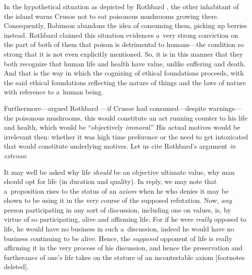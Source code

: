 In the hypothetical situation as depicted by Rothbard 
\parencite*[][p.32]{}, %
 the other inhabitant of the island warns Crusoe not to eat poisonous mushrooms growing there. Consequently, Robinson abandons the idea of consuming them, picking up berries instead. Rothbard claimed this situation evidences a~very strong conviction on the part of both of them that poison is detrimental to humans---the condition so strong that it is not even explicitly mentioned. So, it is in this manner that they both recognize that human life and health have value, unlike suffering and death. And that is the way in which the cognizing of ethical foundations proceeds, with the said ethical foundations reflecting the nature of things and the laws of nature with reference to a~human being.



Furthermore---argued Rothbard 
\parencite*[][pp.32–33]{}%
---if Crusoe had consumed---despite warnings---the poisonous mushrooms, this would constitute an act running counter to his life and health, which would be ``objectively \textit{immoral}.'' His actual motives would be irrelevant then: whether it was high time preference or the need to get intoxicated that would constitute underlying motives. Let us cite Rothbard's 
\parencite*[][pp.32–33]{} %
 argument \textit{in extenso}:



It may well be asked why life \textit{should} be an objective ultimate value, why man should opt for life (in duration and quality). In reply, we may note that a~proposition rises to the status of an \textit{axiom} when he who denies it may be shown to be using it in the very course of the supposed refutation. Now, \textit{any} person participating in any sort of discussion, including one on values, is, by virtue of so participating, alive and affirming life. For if he were \textit{really} opposed to life, he would have no business in such a~discussion, indeed he would have no business continuing to be alive. Hence, the \textit{supposed} opponent of life is really affirming it in the very process of his discussion, and hence the preservation and furtherance of one's life takes on the stature of an incontestable axiom [footnotes deleted].



